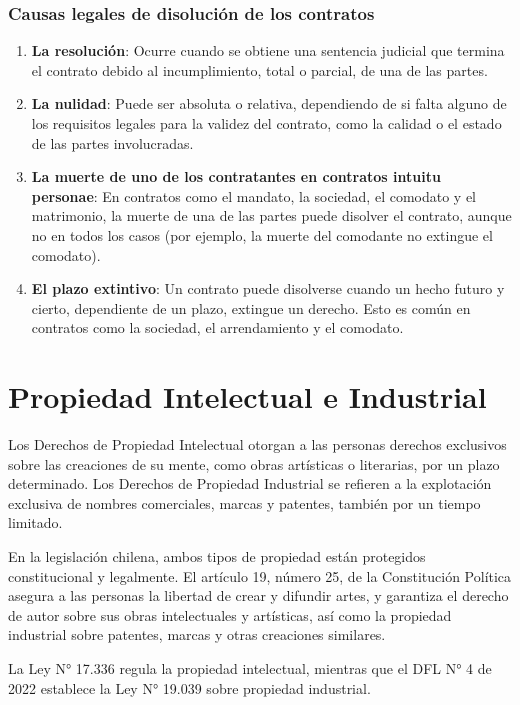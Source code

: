 \documentclass{templateNote}
\begin{document}
\subsubsection{Causas legales de disolución de los contratos}
\begin{enumerate}
    \item \textbf{La resolución}: Ocurre cuando se obtiene una sentencia judicial que termina el contrato debido al incumplimiento, total o parcial, de una de las partes.
    \item \textbf{La nulidad}: Puede ser absoluta o relativa, dependiendo de si falta alguno de los requisitos legales para la validez del contrato, como la calidad o el estado de las partes involucradas.
    \item \textbf{La muerte de uno de los contratantes en contratos intuitu personae}: En contratos como el mandato, la sociedad, el comodato y el matrimonio, la muerte de una de las partes puede disolver el contrato, aunque no en todos los casos (por ejemplo, la muerte del comodante no extingue el comodato).
    \item \textbf{El plazo extintivo}: Un contrato puede disolverse cuando un hecho futuro y cierto, dependiente de un plazo, extingue un derecho. Esto es común en contratos como la sociedad, el arrendamiento y el comodato.
\end{enumerate}

\newpage
\section{Propiedad Intelectual e Industrial}
Los Derechos de Propiedad Intelectual otorgan a las personas derechos exclusivos sobre las creaciones de su mente, como obras artísticas o literarias, por un plazo determinado. Los Derechos de Propiedad Industrial se refieren a la explotación exclusiva de nombres comerciales, marcas y patentes, también por un tiempo limitado.

En la legislación chilena, ambos tipos de propiedad están protegidos constitucional y legalmente. El artículo 19, número 25, de la Constitución Política asegura a las personas la libertad de crear y difundir artes, y garantiza el derecho de autor sobre sus obras intelectuales y artísticas, así como la propiedad industrial sobre patentes, marcas y otras creaciones similares.

La Ley N° 17.336 regula la propiedad intelectual, mientras que el DFL N° 4 de 2022 establece la Ley N° 19.039 sobre propiedad industrial.
\end{document}
